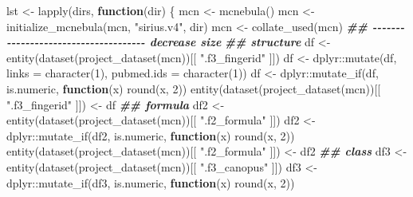 \documentclass[
]{article}
\newenvironment{Shaded}{\begin{snugshade}}{\end{snugshade}}
\newcommand{\AttributeTok}[1]{\textcolor[rgb]{0.77,0.63,0.00}{#1}}
\newcommand{\ControlFlowTok}[1]{\textcolor[rgb]{0.13,0.29,0.53}{\textbf{#1}}}
\newcommand{\DecValTok}[1]{\textcolor[rgb]{0.00,0.00,0.81}{#1}}
\newcommand{\DocumentationTok}[1]{\textcolor[rgb]{0.56,0.35,0.01}{\textbf{\textit{#1}}}}
\newcommand{\FunctionTok}[1]{\textcolor[rgb]{0.00,0.00,0.00}{#1}}
\newcommand{\NormalTok}[1]{#1}
\newcommand{\OtherTok}[1]{\textcolor[rgb]{0.56,0.35,0.01}{#1}}
\newcommand{\SpecialCharTok}[1]{\textcolor[rgb]{0.00,0.00,0.00}{#1}}
\newcommand{\StringTok}[1]{\textcolor[rgb]{0.31,0.60,0.02}{#1}}
\begin{document}
\begin{Shaded}
\begin{Highlighting}[]
\NormalTok{lst }\OtherTok{\textless{}{-}} \FunctionTok{lapply}\NormalTok{(dirs,}
  \ControlFlowTok{function}\NormalTok{(dir) \{}
\NormalTok{    mcn }\OtherTok{\textless{}{-}} \FunctionTok{mcnebula}\NormalTok{()}
\NormalTok{    mcn }\OtherTok{\textless{}{-}} \FunctionTok{initialize\_mcnebula}\NormalTok{(mcn, }\StringTok{"sirius.v4"}\NormalTok{, dir)}
\NormalTok{    mcn }\OtherTok{\textless{}{-}} \FunctionTok{collate\_used}\NormalTok{(mcn)}
    \DocumentationTok{\#\# {-}{-}{-}{-}{-}{-}{-}{-}{-}{-}{-}{-}{-}{-}{-}{-}{-}{-}{-}{-}{-}{-}{-}{-}{-}{-}{-}{-}{-}{-}{-}{-}{-}{-}{-}{-}{-} decrease size}
    \DocumentationTok{\#\# structure}
\NormalTok{    df }\OtherTok{\textless{}{-}} \FunctionTok{entity}\NormalTok{(}\FunctionTok{dataset}\NormalTok{(}\FunctionTok{project\_dataset}\NormalTok{(mcn))[[ }\StringTok{".f3\_fingerid"}\NormalTok{ ]])}
\NormalTok{    df }\OtherTok{\textless{}{-}}\NormalTok{ dplyr}\SpecialCharTok{::}\FunctionTok{mutate}\NormalTok{(df, }\AttributeTok{links =} \FunctionTok{character}\NormalTok{(}\DecValTok{1}\NormalTok{), }\AttributeTok{pubmed.ids =} \FunctionTok{character}\NormalTok{(}\DecValTok{1}\NormalTok{))}
\NormalTok{    df }\OtherTok{\textless{}{-}}\NormalTok{ dplyr}\SpecialCharTok{::}\FunctionTok{mutate\_if}\NormalTok{(df, is.numeric, }\ControlFlowTok{function}\NormalTok{(x) }\FunctionTok{round}\NormalTok{(x, }\DecValTok{2}\NormalTok{))}
    \FunctionTok{entity}\NormalTok{(}\FunctionTok{dataset}\NormalTok{(}\FunctionTok{project\_dataset}\NormalTok{(mcn))[[ }\StringTok{".f3\_fingerid"}\NormalTok{ ]]) }\OtherTok{\textless{}{-}}\NormalTok{ df}
    \DocumentationTok{\#\# formula}
\NormalTok{    df2 }\OtherTok{\textless{}{-}} \FunctionTok{entity}\NormalTok{(}\FunctionTok{dataset}\NormalTok{(}\FunctionTok{project\_dataset}\NormalTok{(mcn))[[ }\StringTok{".f2\_formula"}\NormalTok{ ]])}
\NormalTok{    df2 }\OtherTok{\textless{}{-}}\NormalTok{ dplyr}\SpecialCharTok{::}\FunctionTok{mutate\_if}\NormalTok{(df2, is.numeric, }\ControlFlowTok{function}\NormalTok{(x) }\FunctionTok{round}\NormalTok{(x, }\DecValTok{2}\NormalTok{))}
    \FunctionTok{entity}\NormalTok{(}\FunctionTok{dataset}\NormalTok{(}\FunctionTok{project\_dataset}\NormalTok{(mcn))[[ }\StringTok{".f2\_formula"}\NormalTok{ ]]) }\OtherTok{\textless{}{-}}\NormalTok{ df2}
    \DocumentationTok{\#\# class}
\NormalTok{    df3 }\OtherTok{\textless{}{-}} \FunctionTok{entity}\NormalTok{(}\FunctionTok{dataset}\NormalTok{(}\FunctionTok{project\_dataset}\NormalTok{(mcn))[[ }\StringTok{".f3\_canopus"}\NormalTok{ ]])}
\NormalTok{    df3 }\OtherTok{\textless{}{-}}\NormalTok{ dplyr}\SpecialCharTok{::}\FunctionTok{mutate\_if}\NormalTok{(df3, is.numeric, }\ControlFlowTok{function}\NormalTok{(x) }\FunctionTok{round}\NormalTok{(x, }\DecValTok{2}\NormalTok{))}

\end{Highlighting}
\end{Shaded}
\end{document}
